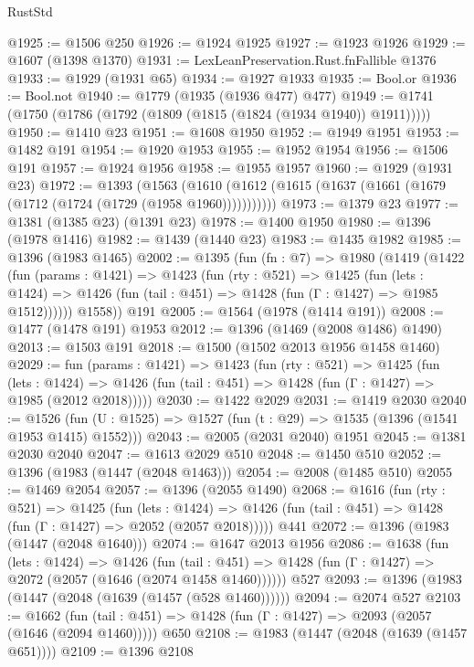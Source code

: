 \begin{lexlean}{RustStd}
\begin{coremodule}
@1925 := @1506 @250
@1926 := @1924 @1925
@1927 := @1923 @1926
@1929 := @1607 (@1398 @1370)
@1931 := LexLeanPreservation.Rust.fnFallible @1376
@1933 := @1929 (@1931 @65)
@1934 := @1927 @1933
@1935 := Bool.or
@1936 := Bool.not
@1940 := @1779 (@1935 (@1936 @477) @477)
@1949 := @1741 (@1750 (@1786 (@1792 (@1809 (@1815 (@1824 (@1934 @1940)) @1911)))))
@1950 := @1410 @23
@1951 := @1608 @1950
@1952 := @1949 @1951
@1953 := @1482 @191
@1954 := @1920 @1953
@1955 := @1952 @1954
@1956 := @1506 @191
@1957 := @1924 @1956
@1958 := @1955 @1957
@1960 := @1929 (@1931 @23)
@1972 := @1393
    (@1563 (@1610 (@1612 (@1615 (@1637 (@1661 (@1679 (@1712 (@1724 (@1729 (@1958 @1960)))))))))))
@1973 := @1379 @23
@1977 := @1381 (@1385 @23) (@1391 @23)
@1978 := @1400 @1950
@1980 := @1396 (@1978 @1416)
@1982 := @1439 (@1440 @23)
@1983 := @1435 @1982
@1985 := @1396 (@1983 @1465)
@2002 := @1395
    (fun (fn : @7) =>
    @1980
      (@1419
        (@1422
          (fun (params : @1421) =>
          @1423
            (fun (rty : @521) =>
            @1425
              (fun (lets : @1424) =>
              @1426 (fun (tail : @451) => @1428 (fun (Γ : @1427) => @1985 @1512))))))
        @1558))
    @191
@2005 := @1564 (@1978 (@1414 @191))
@2008 := @1477 (@1478 @191) @1953
@2012 := @1396 (@1469 (@2008 @1486) @1490)
@2013 := @1503 @191
@2018 := @1500 (@1502 @2013 @1956 @1458 @1460)
@2029 := fun (params : @1421) =>
  @1423
    (fun (rty : @521) =>
    @1425
      (fun (lets : @1424) =>
      @1426 (fun (tail : @451) => @1428 (fun (Γ : @1427) => @1985 (@2012 @2018)))))
@2030 := @1422 @2029
@2031 := @1419 @2030
@2040 := @1526 (fun (U : @1525) => @1527 (fun (t : @29) => @1535 (@1396 (@1541 @1953 @1415) @1552)))
@2043 := @2005 (@2031 @2040) @1951
@2045 := @1381 @2030 @2040
@2047 := @1613 @2029 @510
@2048 := @1450 @510
@2052 := @1396 (@1983 (@1447 (@2048 @1463)))
@2054 := @2008 (@1485 @510)
@2055 := @1469 @2054
@2057 := @1396 (@2055 @1490)
@2068 := @1616
    (fun (rty : @521) =>
    @1425
      (fun (lets : @1424) =>
      @1426 (fun (tail : @451) => @1428 (fun (Γ : @1427) => @2052 (@2057 @2018)))))
    @441
@2072 := @1396 (@1983 (@1447 (@2048 @1640)))
@2074 := @1647 @2013 @1956
@2086 := @1638
    (fun (lets : @1424) =>
    @1426
      (fun (tail : @451) => @1428 (fun (Γ : @1427) => @2072 (@2057 (@1646 (@2074 @1458 @1460))))))
    @527
@2093 := @1396 (@1983 (@1447 (@2048 (@1639 (@1457 (@528 @1460))))))
@2094 := @2074 @527
@2103 := @1662
    (fun (tail : @451) => @1428 (fun (Γ : @1427) => @2093 (@2057 (@1646 (@2094 @1460)))))
    @650
@2108 := @1983 (@1447 (@2048 (@1639 (@1457 @651))))
@2109 := @1396 @2108

\end{coremodule}
\end{lexlean}
